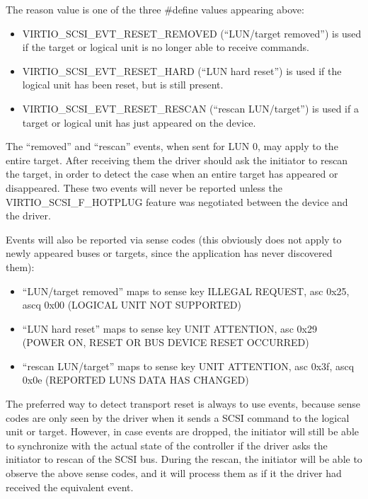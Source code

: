   The reason value is one of the three \#define values appearing
  above:

  \begin{itemize}
  \item VIRTIO_SCSI_EVT_RESET_REMOVED (“LUN/target removed”) is used
    if the target or logical unit is no longer able to receive
    commands.

  \item VIRTIO_SCSI_EVT_RESET_HARD (“LUN hard reset”) is used if the
    logical unit has been reset, but is still present.

  \item VIRTIO_SCSI_EVT_RESET_RESCAN (“rescan LUN/target”) is used if
    a target or logical unit has just appeared on the device.
  \end{itemize}

  The “removed” and “rescan” events, when sent for LUN 0, may
  apply to the entire target. After receiving them the driver
  should ask the initiator to rescan the target, in order to
  detect the case when an entire target has appeared or
  disappeared. These two events will never be reported unless the
  VIRTIO_SCSI_F_HOTPLUG feature was negotiated between the device
  and the driver.

  Events will also be reported via sense codes (this obviously
  does not apply to newly appeared buses or targets, since the
  application has never discovered them):

  \begin{itemize}
  \item “LUN/target removed” maps to sense key ILLEGAL REQUEST, asc
    0x25, ascq 0x00 (LOGICAL UNIT NOT SUPPORTED)

  \item “LUN hard reset” maps to sense key UNIT ATTENTION, asc 0x29
    (POWER ON, RESET OR BUS DEVICE RESET OCCURRED)

  \item “rescan LUN/target” maps to sense key UNIT ATTENTION, asc
    0x3f, ascq 0x0e (REPORTED LUNS DATA HAS CHANGED)
  \end{itemize}

  The preferred way to detect transport reset is always to use
  events, because sense codes are only seen by the driver when it
  sends a SCSI command to the logical unit or target. However, in
  case events are dropped, the initiator will still be able to
  synchronize with the actual state of the controller if the
  driver asks the initiator to rescan of the SCSI bus. During the
  rescan, the initiator will be able to observe the above sense
  codes, and it will process them as if it the driver had
  received the equivalent event.

